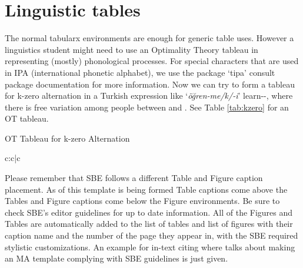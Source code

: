 \section{Linguistic tables}

The normal tabularx environments are enough for generic table uses. However a linguistics student might need to use an Optimality Theory tableau in representing (mostly) phonological processes. For special characters that are used in IPA (international phonetic alphabet), we use the package `tipa' consult package documentation for more information. Now we can try to form a tableau for k-zero alternation in a Turkish expression like `\textit{öğren-me/k/-i}' learn-{\Inf}-{\Acc}, where there is free variation among people between  and . See Table \ref{tab:kzero} for an OT tableau.

\begin{table}[hbt!]
    \caption{OT Tableau for k-zero Alternation}
    \vspace{10pt}
    \centering
    \begin{tableau}{c:c|c}
          
         \vio{*!} \vio{}
         \vio{} \vio{*}
         \vio{} \vio{}
    \end{tableau}

    \label{tab:kzero}
\end{table}

Please remember that SBE follows a different Table and Figure caption placement. As of this template is being formed Table captions come above the Tables and Figure captions come below the Figure environments. Be sure to check SBE's editor guidelines for up to date information. All of the Figures and Tables are automatically added to the list of tables and list of figures with their caption name and the number of the page they appear in, with the SBE required stylistic customizations. An example for in-text citing where \citet{atmaca2020} talks about making an MA template complying with SBE guidelines \citep{atmaca2020} is just given.


